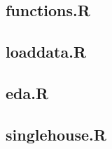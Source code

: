 \subsection{functions.R}

\subsection{loaddata.R}

\subsection{eda.R}

\subsection{singlehouse.R}


\pagebreak



